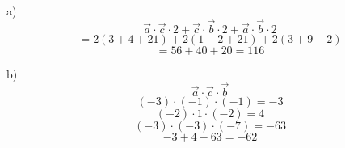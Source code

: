 \documentclass{article}
\begin{document}

a)
\[ \vec{a} \cdot \vec{c} \cdot 2 + \vec{c} \cdot \vec{b} \cdot 2 + \vec{a} \cdot \vec{b} \cdot 2 \]
\[ = 2(3+4+21) + 2(1-2+21) + 2(3+9-2) \]
\[ = 56 + 40 + 20 = 116 \]

b)
\[ \vec{a} \cdot \vec{c} \cdot \vec{b} \]
\[ (-3) \cdot (-1) \cdot (-1) = -3 \]
\[ (-2) \cdot 1 \cdot (-2) = 4 \]
\[ (-3) \cdot (-3) \cdot (-7) = -63 \]
\[ -3 + 4 - 63 = -62 \]
\end{document}
